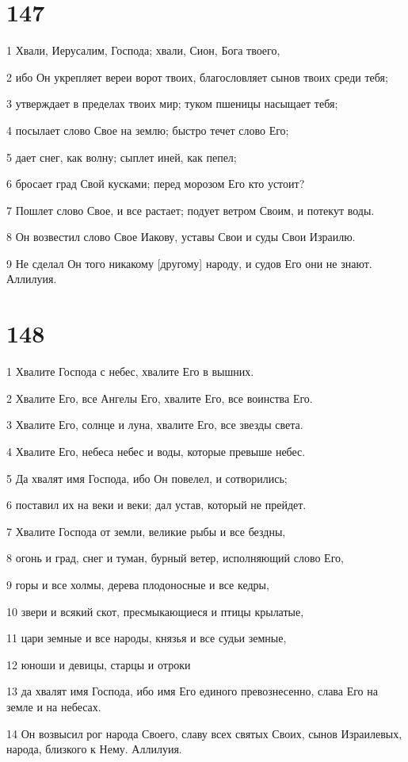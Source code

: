\chapter{147}

\par 1 Хвали, Иерусалим, Господа; хвали, Сион, Бога твоего,
\par 2 ибо Он укрепляет вереи ворот твоих, благословляет сынов твоих среди тебя;
\par 3 утверждает в пределах твоих мир; туком пшеницы насыщает тебя;
\par 4 посылает слово Свое на землю; быстро течет слово Его;
\par 5 дает снег, как волну; сыплет иней, как пепел;
\par 6 бросает град Свой кусками; перед морозом Его кто устоит?
\par 7 Пошлет слово Свое, и все растает; подует ветром Своим, и потекут воды.
\par 8 Он возвестил слово Свое Иакову, уставы Свои и суды Свои Израилю.
\par 9 Не сделал Он того никакому [другому] народу, и судов Его они не знают. Аллилуия.

\chapter{148}

\par 1 Хвалите Господа с небес, хвалите Его в вышних.
\par 2 Хвалите Его, все Ангелы Его, хвалите Его, все воинства Его.
\par 3 Хвалите Его, солнце и луна, хвалите Его, все звезды света.
\par 4 Хвалите Его, небеса небес и воды, которые превыше небес.
\par 5 Да хвалят имя Господа, ибо Он повелел, и сотворились;
\par 6 поставил их на веки и веки; дал устав, который не прейдет.
\par 7 Хвалите Господа от земли, великие рыбы и все бездны,
\par 8 огонь и град, снег и туман, бурный ветер, исполняющий слово Его,
\par 9 горы и все холмы, дерева плодоносные и все кедры,
\par 10 звери и всякий скот, пресмыкающиеся и птицы крылатые,
\par 11 цари земные и все народы, князья и все судьи земные,
\par 12 юноши и девицы, старцы и отроки
\par 13 да хвалят имя Господа, ибо имя Его единого превознесенно, слава Его на земле и на небесах.
\par 14 Он возвысил рог народа Своего, славу всех святых Своих, сынов Израилевых, народа, близкого к Нему. Аллилуия.

